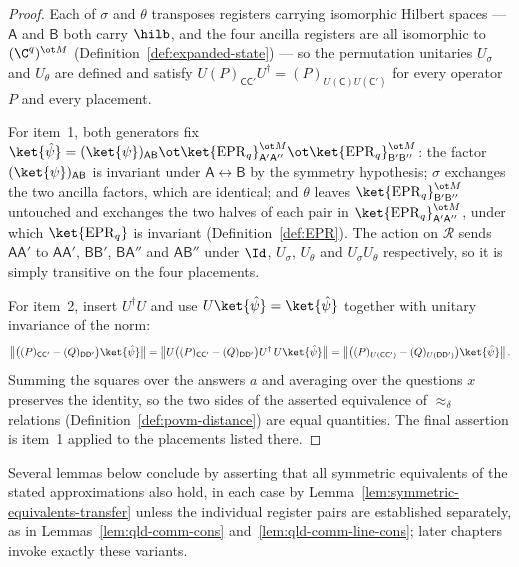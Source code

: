 \begin{proof}
	Each of $\sigma$ and $\theta$ transposes registers carrying isomorphic
	Hilbert spaces --- $\mathsf{A}$ and $\mathsf{B}$ both carry $\hilb$,
	and the four ancilla registers are all isomorphic to
	$(\C^q)^{\ot M}$ (Definition~\ref{def:expanded-state}) --- so the
	permutation unitaries $U_\sigma$ and $U_\theta$ are defined and satisfy
	$U (P)_{\mathsf{C}\mathsf{C}'} U^\dagger = (P)_{U(\mathsf{C})U(\mathsf{C}')}$
	for every operator $P$ and every placement.

	For item~1, both generators fix $\ket{\hat{\psi}} = (\ket{\psi})_{\mathsf{A}\mathsf{B}} \ot \ket{\mathrm{EPR}_q}^{\ot M}_{\mathsf{A}'\mathsf{A}''} \ot \ket{\mathrm{EPR}_q}^{\ot M}_{\mathsf{B}'\mathsf{B}''}$:
	the factor $(\ket{\psi})_{\mathsf{A}\mathsf{B}}$ is invariant under
	$\mathsf{A} \leftrightarrow \mathsf{B}$ by the symmetry hypothesis;
	$\sigma$ exchanges the two ancilla factors, which are identical; and
	$\theta$ leaves $\ket{\mathrm{EPR}_q}^{\ot M}_{\mathsf{B}'\mathsf{B}''}$
	untouched and exchanges the two halves of each pair in
	$\ket{\mathrm{EPR}_q}^{\ot M}_{\mathsf{A}'\mathsf{A}''}$, under which
	$\ket{\mathrm{EPR}_q}$ is invariant (Definition~\ref{def:EPR}). The
	action on $\mathcal{R}$ sends $\mathsf{A}\mathsf{A}'$ to
	$\mathsf{A}\mathsf{A}'$, $\mathsf{B}\mathsf{B}'$,
	$\mathsf{B}\mathsf{A}''$ and $\mathsf{A}\mathsf{B}''$ under $\Id$,
	$U_\sigma$, $U_\theta$ and $U_\sigma U_\theta$ respectively, so it is
	simply transitive on the four placements.

	For item~2, insert $U^\dagger U$ and use $U \ket{\hat{\psi}} = \ket{\hat{\psi}}$
	together with unitary invariance of the norm:
	\[
		\bigl\| \bigl( (P)_{\mathsf{C}\mathsf{C}'} - (Q)_{\mathsf{D}\mathsf{D}'} \bigr) \ket{\hat{\psi}} \bigr\|
		= \bigl\| U \bigl( (P)_{\mathsf{C}\mathsf{C}'} - (Q)_{\mathsf{D}\mathsf{D}'} \bigr) U^\dagger \, U \ket{\hat{\psi}} \bigr\|
		= \bigl\| \bigl( (P)_{U(\mathsf{C}\mathsf{C}')} - (Q)_{U(\mathsf{D}\mathsf{D}')} \bigr) \ket{\hat{\psi}} \bigr\|\,.
	\]
	Summing the squares over the answers $a$ and averaging over the
	questions $x$ preserves the identity, so the two sides of the asserted
	equivalence of $\approx_\delta$ relations
	(Definition~\ref{def:povm-distance}) are equal quantities. The final
	assertion is item~1 applied to the placements listed there.
\end{proof}

Several lemmas below conclude by asserting that all symmetric equivalents
of the stated approximations also hold, in each case by
Lemma~\ref{lem:symmetric-equivalents-transfer} unless the individual register
pairs are established separately, as in Lemmas~\ref{lem:qld-comm-cons}
and~\ref{lem:qld-comm-line-cons}; later chapters invoke exactly these
variants.

